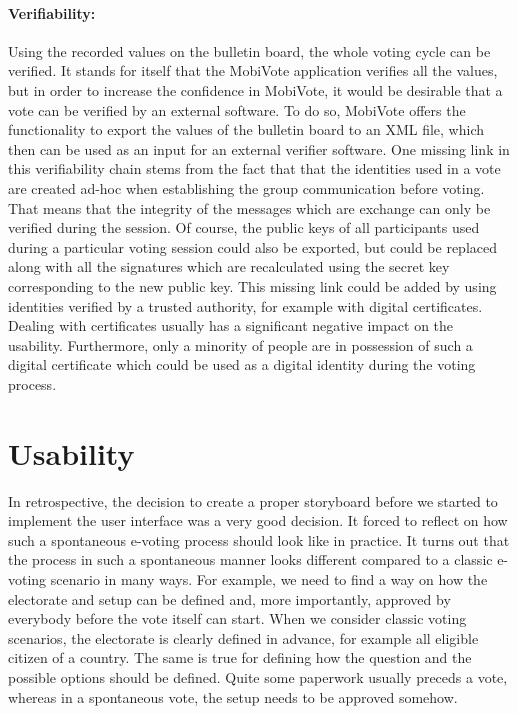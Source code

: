 \documentclass[numbers=noenddot, abstract=on, a4paper, headsepline,
footsepline, oneside, draft=off]{scrreprt}
\begin{document}
\paragraph{Verifiability:} Using the recorded values on the bulletin board, the
whole voting cycle can be verified. It stands for itself that the MobiVote
application verifies all the values, but in order to increase the confidence in
MobiVote, it would be desirable that a vote can be verified by an external
software. To do so, MobiVote offers the functionality to export the values of
the bulletin board to an XML file, which then can be used as an input for an
external verifier software.
One missing link in this verifiability chain stems from the fact that that the
identities used in a vote are created ad-hoc when establishing the group
communication before voting. That means that the integrity of the messages which
are exchange can only be verified during the session. Of course, the public keys
of all participants used during a particular voting session could also be
exported, but could be replaced along with all the signatures which are
recalculated using the secret key corresponding to the new public key. This
missing link could be added by using identities verified by a trusted authority,
for example with digital certificates. Dealing with certificates usually has a
significant negative impact on the usability. Furthermore, only a minority of
people are in possession of such a digital certificate which could be used as a
digital identity during the voting process. 

\section{Usability}
\label{sec:discusionusability}
In retrospective, the decision to create a proper storyboard before we started
to implement the user interface was a very good decision. It forced to reflect
on how such a spontaneous e-voting process should look like in practice. It turns
out that the process in such a spontaneous manner looks different compared to a
classic e-voting scenario in many ways. For example, we need to find a way on
how the electorate and setup can be defined and, more importantly, approved
by everybody before the vote itself can start. When we consider classic voting
scenarios, the electorate is clearly defined in advance, for example all
eligible citizen of a country. The same is true for defining how the question
and the possible options should be defined. Quite some paperwork usually
preceds a vote, whereas in a spontaneous vote, the setup needs to be approved
somehow.
\end{document}
